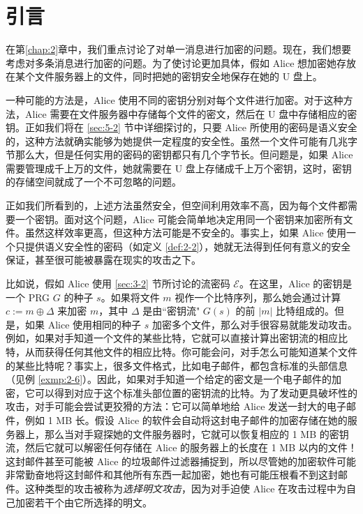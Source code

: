 \section{引言}\label{sec:5-1}

在第\ref{chap:2}章中，我们重点讨论了对单一消息进行加密的问题。现在，我们想要考虑对多条消息进行加密的问题。为了使讨论更加具体，假如 Alice 想加密她存放在某个文件服务器上的文件，同时把她的密钥安全地保存在她的 U 盘上。

一种可能的方法是，Alice 使用不同的密钥分别对每个文件进行加密。对于这种方法，Alice 需要在文件服务器中存储每个文件的密文，然后在 U 盘中存储相应的密钥。正如我们将在 \ref{sec:5-2} 节中详细探讨的，只要 Alice 所使用的密码是语义安全的，这种方法就确实能够为她提供一定程度的安全性。虽然一个文件可能有几兆字节那么大，但是任何实用的密码的密钥都只有几个字节长。但问题是，如果 Alice 需要管理成千上万的文件，她就需要在 U 盘上存储成千上万个密钥，这时，密钥的存储空间就成了一个不可忽略的问题。

正如我们所看到的，上述方法虽然安全，但空间利用效率不高，因为每个文件都需要一个密钥。面对这个问题，Alice 可能会简单地决定用同一个密钥来加密所有文件。虽然这样效率更高，但这种方法可能是不安全的。事实上，如果 Alice 使用一个只提供语义安全性的密码（如定义 \ref{def:2-2}），她就无法得到任何有意义的安全保证，甚至很可能被暴露在现实的攻击之下。

比如说，假如 Alice 使用 \ref{sec:3-2} 节所讨论的流密码 $\mathcal{E}$。在这里，Alice 的密钥是一个 PRG $G$ 的种子 $s$。如果将文件 $m$ 视作一个比特序列，那么她会通过计算 $c:=m\oplus\Delta$ 来加密 $m$，其中 $\Delta$ 是由``密钥流" $G(s)$ 的前 $|m|$ 比特组成的。但是，如果 Alice 使用相同的种子 $s$ 加密多个文件，那么对手很容易就能发动攻击。例如，如果对手知道一个文件的某些比特，它就可以直接计算出密钥流的相应比特，从而获得任何其他文件的相应比特。你可能会问，对手怎么可能知道某个文件的某些比特呢？事实上，很多文件格式，比如电子邮件，都包含标准的头部信息（见例 \ref{exmp:2-6}）。因此，如果对手知道一个给定的密文是一个电子邮件的加密，它可以得到对应于这个标准头部位置的密钥流的比特。为了发动更具破坏性的攻击，对手可能会尝试更狡猾的方法：它可以简单地给 Alice 发送一封大的电子邮件，例如 1 MB 长。假设 Alice 的软件会自动将这封电子邮件的加密存储在她的服务器上，那么当对手窥探她的文件服务器时，它就可以恢复相应的 1 MB 的密钥流，然后它就可以解密任何存储在 Alice 的服务器上的长度在 1 MB 以内的文件！这封邮件甚至可能被 Alice 的垃圾邮件过滤器捕捉到，所以尽管她的加密软件可能非常勤奋地将这封邮件和其他所有东西一起加密，她也有可能压根看不到这封邮件。这种类型的攻击被称为\emph{选择明文攻击}，因为对手迫使 Alice 在攻击过程中为自己加密若干个由它所选择的明文。

